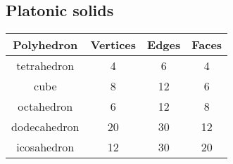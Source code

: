 \subsection{Platonic solids}
\begin{tabular}{ |c|c|c|c| } 
\hline
Polyhedron & Vertices & Edges & Faces \\ 
\hline
tetrahedron & 4 & 6 & 4 \\ 
\hline
cube & 8 & 12 & 6 \\ 
\hline
octahedron & 6 & 12 & 8 \\
\hline
dodecahedron & 20 & 30 & 12 \\
\hline
icosahedron & 12 & 30 & 20 \\
\hline
\end{tabular}
 
